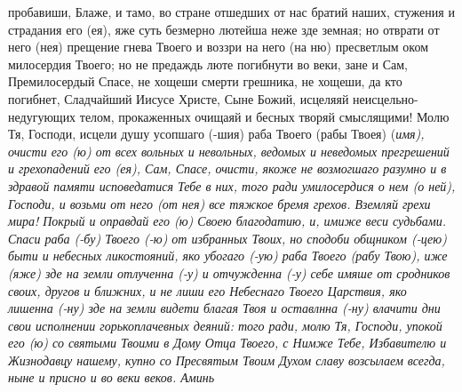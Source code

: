 пробавиши, Блаже, и тамо, во стране отшедших от нас братий наших, стужения и страдания его (ея), яже суть безмерно лютейша неже зде земная; но отврати от него (нея) прещение гнева Твоего и воззри на него (на ню) пресветлым оком милосердия Твоего; но не предаждь люте погибнути во веки, зане и Сам, Премилосердый Спасе, не хощеши смерти грешника, не хощеши, да кто погибнет, Сладчайший Иисусе Христе, Сыне Божий, исцеляяй неисцельно-недугующих телом, прокаженных очищаяй и бесных творяй смыслящими! Молю Тя, Господи, исцели душу усопшаго (-шия) раба Твоего (рабы Твоея) (\itshape имя\normalfont{}), очисти его (ю) от всех вольных и невольных, ведомых и неведомых прегрешений и грехопадений его (ея), Сам, Спасе, очисти, якоже не возмогшаго разумно и в здравой памяти исповедатися Тебе в них, того ради умилосердися о нем (о ней), Господи, и возьми от него (от нея) все тяжкое бремя грехов. Вземляй грехи мира! Покрый и оправдай его (ю) Своею благодатию, и, имиже веси судьбами. Спаси раба (-бу) Твоего (-ю) от избранных Твоих, но сподоби общником (-цею) быти и небесных ликостояний, яко убогаго (-ую) раба Твоего (рабу Твою), иже (яже) зде на земли отлученна (-у) и отчужденна (-у) себе имяше от сродников своих, другов и ближних, и не лиши его Небеснаго Твоего Царствия, яко лишенна (-ну) зде на земли видети благая Твоя и оставлнна (-ну) влачити дни свои исполнении горькоплачевных деяний: того ради, молю Тя, Господи, упокой его (ю) со святыми Твоими в Дому Отца Твоего, с Нимже Тебе, Избавителю и Жизнодавцу нашему, купно со Пресвятым Твоим Духом славу возсылаем всегда, ныне и присно и во веки веков. Аминь
\mychapterending

 


